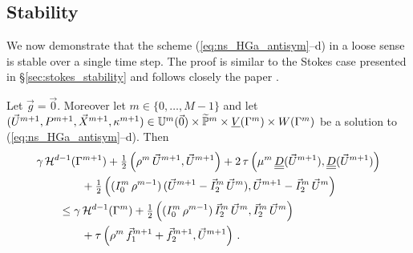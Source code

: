 \subsection{Stability}\label{sec:ns_stability}
We now demonstrate that the scheme (\ref{eq:ns_HGa_antisym}--d) in a loose
sense is stable over a single time step.
The proof is similar to the Stokes case presented in
\S\ref{sec:stokes_stability} and follows closely the paper \cite{fluidfbp}.
\begin{theorem} \label{thm:ns_stability}
Let $\vec g=\vec 0$. Moreover let $m \in \{0,\ldots,M-1\}$ and let
${(\vec U^{m+1},P^{m+1},\vec X^{m+1}, \kappa^{m+1}) \in \mathbb{U}^{m}(\vec{0})\times
\widetilde{\mathbb{P}}^m \times \underline{V}(\Gamma^m) \times W(\Gamma^m)}$ be a solution to
(\ref{eq:ns_HGa_antisym}--d). Then
\begin{align}\label{eq:ns_stab}
& \gamma\, \surfvol(\Gamma^{m+1})
+ \tfrac{1}{2}\left(\rho^m\,\vec U^{m+1}, \vec U^{m+1} \right)
+ 2\,\tau\left(\mu^m\,\mat D(\vec U^{m+1}), \mat D(\vec U^{m+1})\right)
\nonumber \\
& \qquad\qquad + \tfrac{1}{2}\left((I^m_0\,\rho^{m-1})\,(\vec U^{m+1}
-\vec I^m_2\,\vec U^m), \vec U^{m+1} - \vec I^m_2\,\vec U^m \right) \nonumber \\
& \qquad \leq \gamma\, \surfvol(\Gamma^m) +
\tfrac{1}{2}\left((I^m_0\,\rho^{m-1})\,\vec I^m_2\,\vec U^m,
\vec I^m_2\,\vec U^m \right)\nonumber \\
& \qquad\qquad + \tau\left(\rho^m\,\vec f_1^{m+1}+\vec f_2^{m+1}, \vec U^{m+1}
\right)\,.
\end{align}
\end{theorem}
